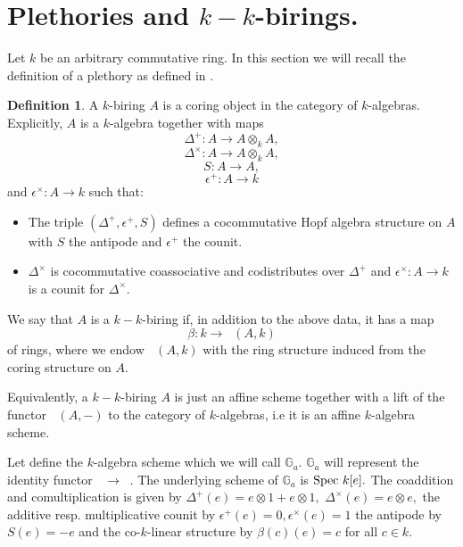 \documentclass[a4paper, 12pt]{amsart}
\DeclareMathOperator{\Ringk}{Ring_k}
\numberwithin{equation}{section}
\theoremstyle{definition}
\newtheorem{definition}[theorem]{Definition}
\begin{document}
\section{Plethories and $k-k$-birings.}

\noindent Let $k$ be an arbitrary commutative ring. In this section we will recall
the definition of a plethory as defined in \cite{BW}.

\begin{definition}

A $k$-biring $A$ is a coring object in the category of $k$-algebras.
Explicitly, $A$ is a $k$-algebra together with maps $$\Delta^+: A
\rightarrow A \otimes_k A,$$ $$\Delta^\times : A \rightarrow A \otimes_k
A,$$ $$S:A \rightarrow A,$$ $$\epsilon^+:A \rightarrow k$$and
$\epsilon^\times:A \rightarrow k$ such that: \\ \begin{itemize}

\item The triple $(\Delta^+,\epsilon^+,S)$ defines a cocommutative Hopf
algebra structure on $A$ with $S$ the antipode and $\epsilon^+$ the counit.

\item $\Delta^\times$ is cocommutative coassociative and codistributes
over $\Delta^+$ and $\epsilon^\times:A \rightarrow k$ is a counit for
$\Delta^\times.$

\end{itemize} 
\noindent We say that $A$ is a $k-k$-biring if, in addition to the above data, it
has a map $$\beta:k \rightarrow \Ringk(A,k)$$ of rings, where we endow
$\Ringk(A,k)$ with the ring structure induced from the coring structure
on $A.$
\end{definition}

\noindent Equivalently, a $k-k$-biring $A$ is just an affine scheme together with a lift of
the functor $\Ringk(A,-)$ to the category of $k$-algebras, i.e it is an affine
$k$-algebra scheme. 
\begin{example}
\noindent Let define the $k$-algebra scheme which we will call $\mathbb{G}_a.$ $\mathbb{G}_a$ will represent the identity functor $\Ringk \rightarrow \Ringk.$ The underlying scheme of $\mathbb{G}_a$ is  $\text{Spec } k[e].$  The coaddition and comultiplication is given by $\Delta^+(e) = e
\otimes 1 + e \otimes 1,$ $\Delta^\times(e) = e \otimes e,$ the additive resp. multiplicative counit by 
$\epsilon^+(e)=0,\epsilon^\times(e)=1$ the antipode by $S(e)=-e$ and the co-$k$-linear structure by $\beta(c)(e) = c$ for all
$c \in k.$
\end{example}
\end{document}
